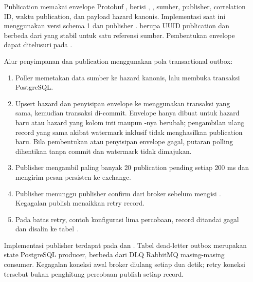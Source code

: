 Publication memakai envelope Protobuf , berisi
, , sumber, publisher, correlation ID,
waktu publication, dan payload hazard kanonis. Implementasi saat ini
menggunakan versi schema 1 dan publisher .
 berupa UUID publication dan berbeda dari 
yang stabil untuk satu referensi sumber. Pembentukan envelope dapat
ditelusuri pada .

Alur penyimpanan dan publication menggunakan pola transactional outbox:
\begin{enumerate}
    \item Poller memetakan data sumber ke hazard kanonis, lalu membuka
    transaksi PostgreSQL.
    \item Upsert hazard dan penyisipan envelope ke 
    menggunakan transaksi yang sama, kemudian transaksi di-commit.
    Envelope hanya dibuat untuk hazard baru atau hazard yang kolom inti
    maupun -nya berubah; pengambilan ulang record yang
    sama akibat watermark inklusif tidak menghasilkan publication baru.
    Bila pembentukan atau penyisipan envelope gagal, putaran polling
    dihentikan tanpa commit dan watermark tidak dimajukan.
    \item Publisher mengambil paling banyak 20 publication pending
    setiap 200 ms dan mengirim pesan persisten ke exchange.
    \item Publisher menunggu publisher confirm dari broker sebelum
    mengisi . Kegagalan publish menaikkan retry record.
    \item Pada batas retry, contoh konfigurasi lima percobaan, record
    ditandai gagal dan disalin ke tabel .
\end{enumerate}

Implementasi publisher terdapat pada
 dan
.
Tabel dead-letter outbox merupakan state PostgreSQL producer, berbeda
dari DLQ RabbitMQ masing-masing consumer. Kegagalan koneksi awal broker
diulang setiap dua detik; retry koneksi tersebut bukan penghitung percobaan
publish setiap record.

